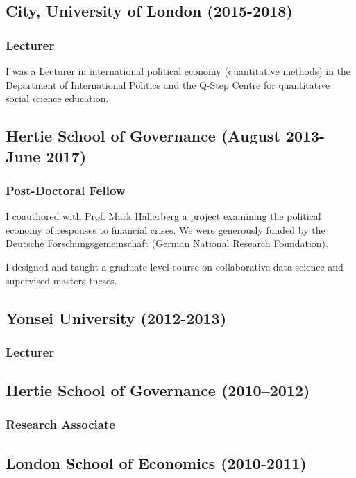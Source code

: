 \documentclass[a4paper]{article}
\begin{document}
\subsection*{City, University of London (2015-2018)}

\subsubsection*{Lecturer}

I was a Lecturer in international political economy (quantitative methods) in the Department of International Politics and the Q-Step Centre for quantitative social science education.

\subsection*{Hertie School of Governance (August 2013-June 2017)}

\subsubsection*{Post-Doctoral Fellow}

I coauthored with Prof. Mark Hallerberg a project examining the political economy of responses to financial crises. We were generously funded by the Deutsche Forschungsgemeinschaft (German National Research Foundation).\vspace{0.25cm}

\noindent I designed and taught a graduate-level course on collaborative data science and supervised masters theses.

\subsection*{Yonsei University (2012-2013)}
\subsubsection*{Lecturer}

\subsection*{Hertie School of Governance (2010--2012)}
\subsubsection*{Research Associate}

\subsection*{London School of Economics (2010-2011)}
\end{document}
